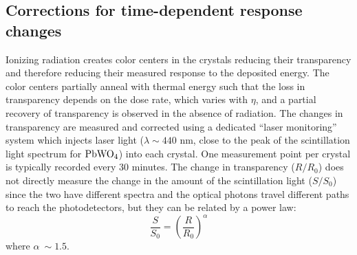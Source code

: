 \documentclass[journal]{IEEEtran}
\begin{document}
\subsection{Corrections for time-dependent response changes}
\label{sec:timedependence}
Ionizing radiation creates color centers in the crystals reducing their transparency and therefore reducing their measured response to the deposited energy. The color centers partially anneal with thermal energy such that the loss in transparency depends on the dose rate, which varies with $\eta$, and a partial recovery of transparency is observed in the absence of radiation. The changes in transparency are measured and corrected using a dedicated ``laser monitoring'' system \cite{Anfreville:2007zz} which injects laser light ($\lambda \sim 440$ nm, close to the peak of the scintillation light spectrum for $\rm PbWO_4$) into each crystal. One measurement point per crystal is typically recorded every 30 minutes. The change in transparency ($R/R_0$) does not directly measure the change in the amount of the scintillation light ($S/S_0$) since the two have different spectra and the optical photons travel different paths to reach the photodetectors, but they can be related by a power law:
\begin{equation}
\label{eqn:alpha}
\frac{S}{S_0} = \left(\frac{R}{R_0}\right)^\alpha
\end{equation}
where $\alpha ~\sim 1.5$.
\end{document}
